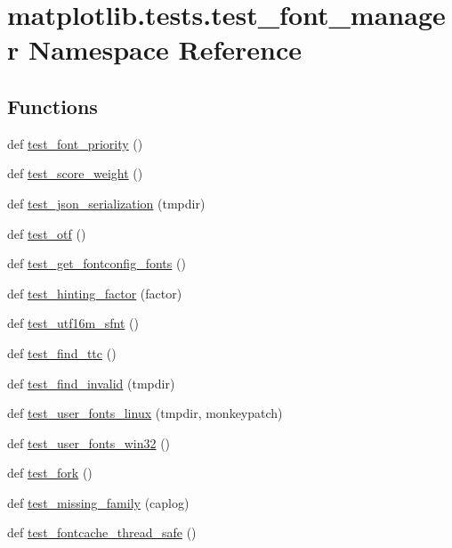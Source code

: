 \hypertarget{namespacematplotlib_1_1tests_1_1test__font__manager}{}\section{matplotlib.\+tests.\+test\+\_\+font\+\_\+manager Namespace Reference}
\label{namespacematplotlib_1_1tests_1_1test__font__manager}
\subsection*{Functions}
\begin{DoxyCompactItemize}
\item 
def \hyperlink{namespacematplotlib_1_1tests_1_1test__font__manager_ad44c3c8188882af548e366aa4b1db430}{test\+\_\+font\+\_\+priority} ()
\item 
def \hyperlink{namespacematplotlib_1_1tests_1_1test__font__manager_a6922fb162236d442a65bc2efebced278}{test\+\_\+score\+\_\+weight} ()
\item 
def \hyperlink{namespacematplotlib_1_1tests_1_1test__font__manager_a1d17e73cfe910d41ab2ce405986af8c8}{test\+\_\+json\+\_\+serialization} (tmpdir)
\item 
def \hyperlink{namespacematplotlib_1_1tests_1_1test__font__manager_ae237fb7c5db7b5608bcac1a2d2a91366}{test\+\_\+otf} ()
\item 
def \hyperlink{namespacematplotlib_1_1tests_1_1test__font__manager_a459841f8419d2162f58b20ba311095e6}{test\+\_\+get\+\_\+fontconfig\+\_\+fonts} ()
\item 
def \hyperlink{namespacematplotlib_1_1tests_1_1test__font__manager_ae32f2225b3d880057c8ced9ce709c794}{test\+\_\+hinting\+\_\+factor} (factor)
\item 
def \hyperlink{namespacematplotlib_1_1tests_1_1test__font__manager_a6a2e405b56ed699b7df0643868cba6db}{test\+\_\+utf16m\+\_\+sfnt} ()
\item 
def \hyperlink{namespacematplotlib_1_1tests_1_1test__font__manager_af3acf2faf02f769df831cb357f8e268f}{test\+\_\+find\+\_\+ttc} ()
\item 
def \hyperlink{namespacematplotlib_1_1tests_1_1test__font__manager_ac16991980b46b33f4597ffc04081d370}{test\+\_\+find\+\_\+invalid} (tmpdir)
\item 
def \hyperlink{namespacematplotlib_1_1tests_1_1test__font__manager_aff283b04ef27b92bb86c4e105bd5972f}{test\+\_\+user\+\_\+fonts\+\_\+linux} (tmpdir, monkeypatch)
\item 
def \hyperlink{namespacematplotlib_1_1tests_1_1test__font__manager_a9c13e6f0e9766a5700d8ac62c6a5beca}{test\+\_\+user\+\_\+fonts\+\_\+win32} ()
\item 
def \hyperlink{namespacematplotlib_1_1tests_1_1test__font__manager_ac285181f4af9f66e4b90ca3483c13270}{test\+\_\+fork} ()
\item 
def \hyperlink{namespacematplotlib_1_1tests_1_1test__font__manager_aaa4a4a765f88a406b6a4686b359baa8b}{test\+\_\+missing\+\_\+family} (caplog)
\item 
def \hyperlink{namespacematplotlib_1_1tests_1_1test__font__manager_a42617ca0b26a246cc7f0bc59e665bc4d}{test\+\_\+fontcache\+\_\+thread\+\_\+safe} ()
\end{DoxyCompactItemize}
